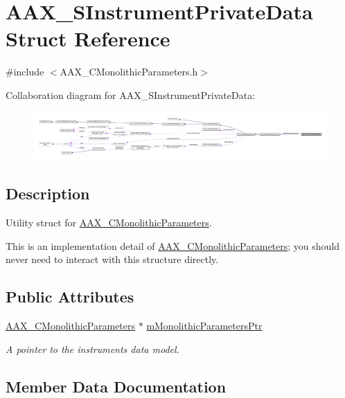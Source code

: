\hypertarget{a00122}{}\section{A\+A\+X\+\_\+\+S\+Instrument\+Private\+Data Struct Reference}
\label{a00122}


{\ttfamily \#include $<$A\+A\+X\+\_\+\+C\+Monolithic\+Parameters.\+h$>$}



Collaboration diagram for A\+A\+X\+\_\+\+S\+Instrument\+Private\+Data\+:
\nopagebreak
\begin{figure}[H]
\begin{center}
\leavevmode
\includegraphics[width=350pt]{a00674}
\end{center}
\end{figure}


\subsection{Description}
Utility struct for \hyperlink{a00026}{A\+A\+X\+\_\+\+C\+Monolithic\+Parameters}. 

This is an implementation detail of \hyperlink{a00026}{A\+A\+X\+\_\+\+C\+Monolithic\+Parameters}; you should never need to interact with this structure directly. \subsection*{Public Attributes}
\begin{DoxyCompactItemize}
\item 
\hyperlink{a00026}{A\+A\+X\+\_\+\+C\+Monolithic\+Parameters} $\ast$ \hyperlink{a00122_a92919c61cae3c04a28bfacb3c48d0120}{m\+Monolithic\+Parameters\+Ptr}
\begin{DoxyCompactList}\small\item\em A pointer to the instrument\textquotesingle{}s data model. \end{DoxyCompactList}\end{DoxyCompactItemize}


\subsection{Member Data Documentation}
\hypertarget{a00122_a92919c61cae3c04a28bfacb3c48d0120}{}
